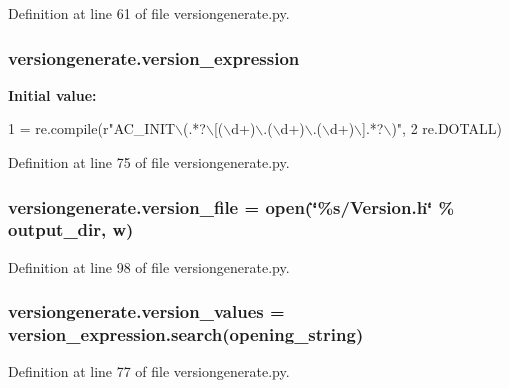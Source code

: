 Definition at line 61 of file versiongenerate.\+py.

\subsubsection[{\texorpdfstring{version\+\_\+expression}{version_expression}}]{\setlength{\rightskip}{0pt plus 5cm}versiongenerate.\+version\+\_\+expression}\hypertarget{namespaceversiongenerate_a83861e707250395976fdfee3396a0fff}{}\label{namespaceversiongenerate_a83861e707250395976fdfee3396a0fff}
{\bfseries Initial value\+:}
\begin{DoxyCode}
1 = re.compile(\textcolor{stringliteral}{r"AC\_INIT\(\backslash\)(.*?\(\backslash\)[(\(\backslash\)d+)\(\backslash\).(\(\backslash\)d+)\(\backslash\).(\(\backslash\)d+)\(\backslash\)].*?\(\backslash\))"},
2                                 re.DOTALL)
\end{DoxyCode}


Definition at line 75 of file versiongenerate.\+py.

\subsubsection[{\texorpdfstring{version\+\_\+file}{version_file}}]{\setlength{\rightskip}{0pt plus 5cm}versiongenerate.\+version\+\_\+file = open(\char`\"{}\%s/{\bf Version.\+h}\char`\"{} \% output\+\_\+dir, \textquotesingle{}w\textquotesingle{})}\hypertarget{namespaceversiongenerate_a3cb3deeb1538014cd32e4253fe298e27}{}\label{namespaceversiongenerate_a3cb3deeb1538014cd32e4253fe298e27}


Definition at line 98 of file versiongenerate.\+py.

\subsubsection[{\texorpdfstring{version\+\_\+values}{version_values}}]{\setlength{\rightskip}{0pt plus 5cm}versiongenerate.\+version\+\_\+values = version\+\_\+expression.\+search({\bf opening\+\_\+string})}\hypertarget{namespaceversiongenerate_a0ce22d4ba772e519b000413a3bf5445c}{}\label{namespaceversiongenerate_a0ce22d4ba772e519b000413a3bf5445c}


Definition at line 77 of file versiongenerate.\+py.

